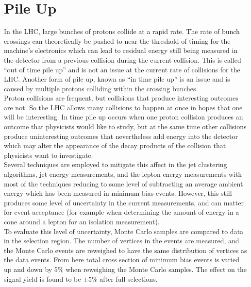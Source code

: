 \section{Pile Up}
In the LHC, large bunches of protons collide at a rapid rate. The rate of bunch crossings can theoretically be pushed to near the threshold of timing for the machine's electronics which can lead to residual energy still being measured in the detector from a previous collision during the current collision. This is called ``out of time pile up'' and is not an issue at the current rate of collisions for the LHC. Another form of pile up, known as ``in time pile up'' is an issue and is caused by multiple protons colliding within the crossing bunches.\\ 

Proton collisions are frequent, but collisions that produce interesting outcomes are not. So the LHC allows many collisions to happen at once in hopes that one will be interesting. In time pile up occurs when one proton collision produces an outcome that physicists would like to study, but at the same time other collisions produce uninteresting outcomes that nevertheless add energy into the detector which may alter the appearance of the decay products of the collision that physicists want to investigate.\\

Several techniques are employed to mitigate this affect in the jet clustering algorithms, jet energy measurements, and the lepton energy measurements with most of the techniques reducing to some level of subtracting an average ambient energy which has been measured in minimum bias events. However, this still produces some level of uncertainty in the current measurements, and can matter for event acceptance (for example when determining the amount of energy in a cone around a lepton for an isolation measurement).\\

To evaluate this level of uncertainty, Monte Carlo samples are compared to data in the selection region. The number of vertices in the events are measured, and the Monte Carlo events are reweighed to have the same distribution of vertices as the data events. From here total cross section of minimum bias events is varied up and down by 5\% when reweighing the Monte Carlo samples. The effect on the signal yield is found to be $\pm 5\%$ after full selections.
